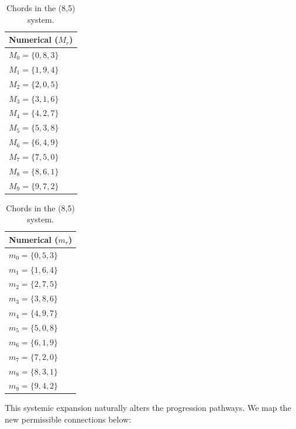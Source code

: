 \documentclass[11pt,letterpaper]{amsart}
\begin{document}
{\tiny \begin{table}[H]
    \centering
    \begin{minipage}{0.48\textwidth}
        \centering
        \begin{tabular}{l}
        \toprule
        \textbf{Numerical ($M_r$)} \\
        \midrule
        $M_0 = \{0, 8, 3\}$ \\
        $M_1 = \{1, 9, 4\}$ \\
        $M_2 = \{2, 0, 5\}$ \\
        $M_3 = \{3, 1, 6\}$ \\
        $M_4 = \{4, 2, 7\}$ \\
        $M_5 = \{5, 3, 8\}$ \\
        $M_6 = \{6, 4, 9\}$ \\
        $M_7 = \{7, 5, 0\}$ \\
        $M_8 = \{8, 6, 1\}$ \\
        $M_9 = \{9, 7, 2\}$ \\
        \bottomrule
        \end{tabular}
    \end{minipage}\hfill
    \begin{minipage}{0.48\textwidth}
        \centering
        \begin{tabular}{l}
        \toprule
        \textbf{Numerical ($m_r$)} \\
        \midrule
        $m_0 = \{0, 5, 3\}$ \\
        $m_1 = \{1, 6, 4\}$ \\
        $m_2 = \{2, 7, 5\}$ \\
        $m_3 = \{3, 8, 6\}$ \\
        $m_4 = \{4, 9, 7\}$ \\
        $m_5 = \{5, 0, 8\}$ \\
        $m_6 = \{6, 1, 9\}$ \\
        $m_7 = \{7, 2, 0\}$ \\
        $m_8 = \{8, 3, 1\}$ \\
        $m_9 = \{9, 4, 2\}$ \\
        \bottomrule
        \end{tabular}
    \end{minipage}
    \caption{Chords in the (8,5) system.}
\end{table}}

This systemic expansion naturally alters the progression pathways. We map the new permissible connections below:
\end{document}
